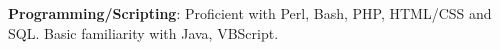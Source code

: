 \begin{resume}
\textbf{Programming/Scripting}: Proficient with Perl, Bash, PHP, HTML/CSS and SQL. Basic familiarity with Java, VBScript.










\end{resume}

